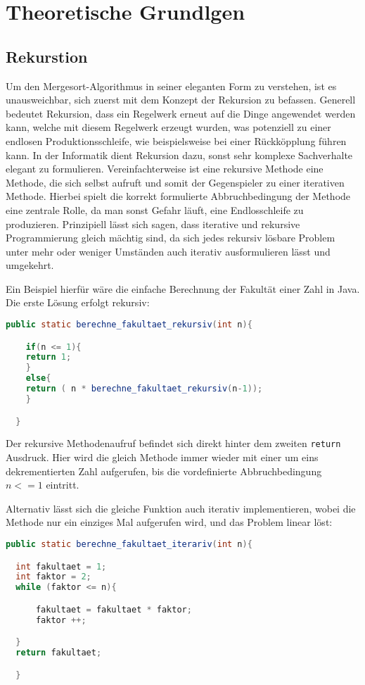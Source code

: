 \chapter{Theoretische Grundlgen}\label{chap:theoretische-grundlagen}
\section{Rekurstion}
Um den Mergesort-Algorithmus in seiner eleganten Form zu verstehen, ist es unausweichbar, sich zuerst mit dem
Konzept der Rekursion zu befassen. Generell bedeutet Rekursion, dass ein Regelwerk erneut auf die Dinge angewendet werden kann,
welche mit diesem Regelwerk erzeugt wurden, was potenziell zu einer endlosen Produktionsschleife, wie beispielsweise bei einer Rückköpplung
führen kann. In der Informatik dient Rekursion dazu, sonst sehr komplexe Sachverhalte elegant zu formulieren. Vereinfachterweise ist eine rekursive Methode
eine Methode, die sich selbst aufruft und somit der Gegenspieler zu einer iterativen Methode. Hierbei spielt die korrekt formulierte Abbruchbedingung der Methode eine zentrale Rolle, da man sonst Gefahr läuft,
eine Endlosschleife zu produzieren. Prinzipiell lässt sich sagen, dass iterative und rekursive Programmierung gleich mächtig sind, da sich jedes rekursiv lösbare Problem
unter mehr oder weniger Umständen auch iterativ ausformulieren lässt und umgekehrt.

Ein Beispiel hierfür wäre die einfache Berechnung der Fakultät einer Zahl in Java. Die erste Lösung erfolgt rekursiv:

\begin{lstlisting}[language=Java]
  public static berechne_fakultaet_rekursiv(int n){

    if(n <= 1){
    return 1;
    }
    else{
    return ( n * berechne_fakultaet_rekursiv(n-1));
    }

  }
\end{lstlisting}

Der rekursive Methodenaufruf befindet sich direkt hinter dem zweiten \texttt{return} Ausdruck. Hier wird die gleich Methode immer wieder
mit einer um eins dekrementierten Zahl aufgerufen, bis die vordefinierte Abbruchbedingung $n <= 1$ eintritt.

Alternativ lässt sich die gleiche Funktion auch iterativ implementieren, wobei die Methode nur ein einziges Mal aufgerufen wird,
und das Problem linear löst:

\begin{lstlisting}[language=Java]
  public static berechne_fakultaet_iterariv(int n){

  int fakultaet = 1;
  int faktor = 2;
  while (faktor <= n){

      fakultaet = fakultaet * faktor;
      faktor ++;

  }
  return fakultaet;

  }
\end{lstlisting}

